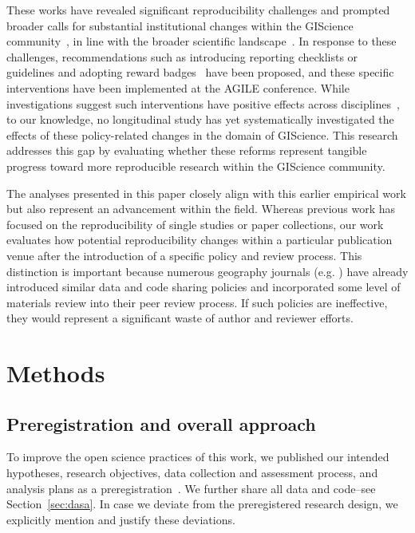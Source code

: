 \documentclass{josis}
\begin{document}
These works have revealed significant reproducibility challenges and prompted broader calls for substantial institutional changes within the GIScience community~\cite{kedron_reproducibility_2021}, in line with the broader scientific landscape~\cite{munafo_manifesto_2017, davis-stober2025}. 
In response to these challenges, recommendations such as introducing reporting checklists or guidelines and adopting reward badges~\cite{dudda_open_2025} have been proposed, and these specific interventions have been implemented at the AGILE conference.
While investigations suggest such interventions have positive effects across disciplines~\cite{stodden_empirical_2018, hardwicke_empirical_2020, dudda_open_2025, breznau2025, Fiar2024}, to our knowledge, no longitudinal study has yet systematically investigated the effects of these policy-related changes in the domain of GIScience. This research addresses this gap by evaluating whether these reforms represent tangible progress toward more reproducible research within the GIScience community.

The analyses presented in this paper closely align with this earlier empirical work but also represent an advancement within the field. 
Whereas previous work has focused on the reproducibility of single studies or paper collections, our work evaluates how potential reproducibility changes within a particular publication venue after the introduction of a specific policy and review process.
This distinction is important because numerous geography journals (e.g. \cite{Cannon2022}) have already introduced similar data and code sharing policies and incorporated some level of materials review into their peer review process. 
If such policies are ineffective, they would represent a significant waste of author and reviewer efforts.


\section{Methods}
\label{sec:methods}

\subsection{Preregistration and overall approach}

To improve the open science practices of this work, we published our intended hypotheses, research objectives, data collection and assessment process, and analysis plans as a preregistration~\cite{nust2023_prereg}.
We further share all data and code--see Section~\ref{sec:dasa}.
In case we deviate from the preregistered research design, we explicitly mention and justify these deviations.
\end{document}
